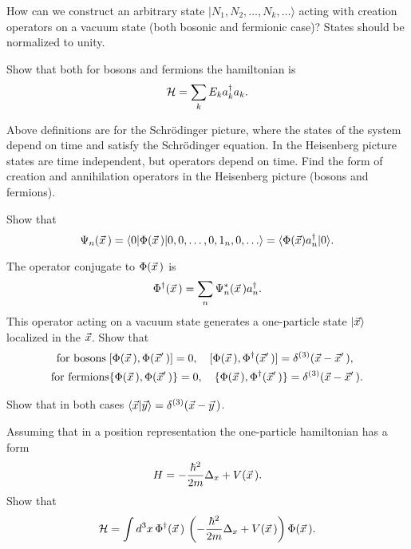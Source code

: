 \documentclass[a4paper,11pt]{article}
\begin{document}
\begin{enumerate}
  How can we construct an arbitrary state
  $| N_{ 1 }, N_{ 2 }, \ldots, N_{ k }, \ldots \rangle$ acting with creation operators
  on a vacuum state (both bosonic and fermionic case)? States should
  be normalized to unity.

  Show that both for bosons and fermions the hamiltonian is
  \begin{equation}
    \label{eq:19}
    \mathcal{H} = \sum_{ k } E_{ k } a_{ k }^{ \dagger } a_{ k }.
  \end{equation}

  Above definitions are for the Schr\"{o}dinger picture, where the states
  of the system depend on time and satisfy the Schr\"{o}dinger equation. In
  the Heisenberg picture states are time independent, but operators depend
  on time. Find the form of creation and annihilation operators in the
  Heisenberg picture (bosons and fermions).

  Show that
  \begin{equation}
    \label{eq:22}
    \Psi_{ n }( \vec{x} \, ) =
    \langle 0 | \Phi( \vec{x} \, ) | 0, 0, \ldots, 0, 1_{ n }, 0, \ldots \rangle
    = \langle \Phi( \vec{x} ) a_{ n }^{ \dagger } | 0 \rangle.
  \end{equation}

  The operator conjugate to $\Phi( \vec{x} \, )$ is
  \begin{equation}
    \label{eq:23}
    \Phi^{ \dagger }( \vec{x} \, ) =
    \sum_{ n } \Psi_{ n }^{ * }( \vec{x} \, ) a_{ n }^{ \dagger }.
  \end{equation}
  This operator acting on a vacuum state generates a one-particle state
  $| \vec{x} \rangle$ localized in the $\vec{x}$. Show that
  \begin{align}
    \textrm{for bosons} \;
    &[ \Phi( \vec{x} \, ), \Phi( \vec{x}' \, ) ] = 0, \quad
      [ \Phi( \vec{x} \, ), \Phi^{ \dagger }( \vec{x}' \, ) ]
      = \delta^{ ( 3 ) }( \vec{x} - \vec{x}' \, ), \\
    \textrm{for fermions}
    &\{ \Phi( \vec{x} \, ), \Phi( \vec{x}' \, ) \} = 0, \quad
    \{ \Phi( \vec{x} \, ), \Phi^{ \dagger }( \vec{x}' \, ) \}
    = \delta^{ ( 3 ) }( \vec{x} - \vec{x}' \, ).
  \end{align}

  Show that in both cases
  $\langle \vec{x} | \vec{y} \rangle = \delta^{ ( 3 ) }( \vec{x} - \vec{y} \, )$.

  Assuming that in a position representation the one-particle hamiltonian
  has a form
  \begin{equation}
    \label{eq:24}
    H = -\frac{ \hbar^{ 2 } }{ 2m } \Delta_{ x } + V( \vec{x} \, ).
  \end{equation}
  Show that
  \begin{equation}
    \label{eq:25}
    \mathcal{H} =
    \int d^{ 3 } x \, \Phi^{ \dagger }( \vec{x} \, ) \,
    \left( -\frac{ \hbar^{ 2 } }{ 2m } \Delta_{ x } + V( \vec{x} \, ) \right)
    \Phi( \vec{x} \, ).
  \end{equation}


\end{enumerate}
\end{document}
